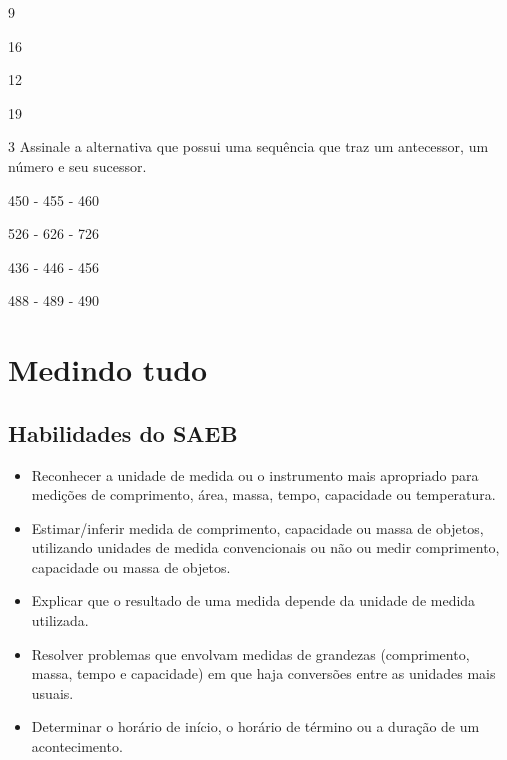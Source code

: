 \begin{escolha}

\begin{multicols}{2}

\item 9

\item 16
\end{multicols}


\begin{multicols}{2}

\item 12

\item 19
\end{multicols}
\end{escolha}

\num{3} Assinale a alternativa que possui uma sequência que traz um antecessor, um número e seu sucessor.

\begin{escolha}
\item 450 - 455 - 460

\item 526 - 626 - 726

\item 436 - 446 - 456

\item 488 - 489 - 490
\end{escolha}

\chapter{Medindo tudo}

\enlargethispage{3\baselineskip}

\section*{Habilidades do SAEB}

\begin{itemize}
\item Reconhecer a unidade de medida ou o instrumento mais apropriado para
medições de comprimento, área, massa, tempo, capacidade ou temperatura.

\item Estimar/inferir medida de comprimento, capacidade ou massa de objetos,
utilizando unidades de medida convencionais ou não ou medir comprimento,
capacidade ou massa de objetos.

\item Explicar que o resultado de uma medida depende da unidade de medida
utilizada.

\item Resolver problemas que envolvam medidas de grandezas (comprimento,
massa, tempo e capacidade) em que haja conversões entre as unidades mais
usuais.

\item Determinar o horário de início, o horário de término ou a duração de
um acontecimento.
\end{itemize}

